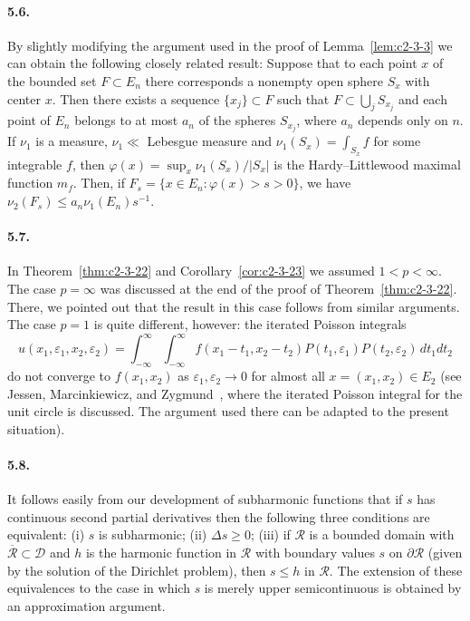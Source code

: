 \paragraph{5.6.} By slightly modifying the argument used in the proof of Lemma~\ref{lem:c2-3-3} we can obtain the following closely related result: Suppose that to each point $x$ of the bounded set $F \subset E_n$ there corresponds a nonempty open sphere $S_x$ with center $x$. Then there exists a sequence $\{x_j\} \subset F$ such that $F \subset \bigcup_j S_{x_j}$ and each point of $E_n$ belongs to at most $a_n$ of the spheres $S_{x_j}$, where $a_n$ depends only on $n$. If $\nu_1$ is a measure, $\nu_1 \ll$ Lebesgue measure and $\nu_1(S_x) = \int_{S_x} f$ for some integrable $f$, then $\varphi(x) = \sup_x \nu_1(S_x)/|S_x|$ is the Hardy--Littlewood maximal function $m_f$. Then, if $F_s = \{x \in E_n : \varphi(x) > s > 0\}$, we have $\nu_2(F_s) \leq a_n \nu_1(E_n) s^{-1}$.

\paragraph{5.7.} In Theorem~\ref{thm:c2-3-22} and Corollary~\ref{cor:c2-3-23} we assumed $1 < p < \infty$. The case $p = \infty$ was discussed at the end of the proof of Theorem~\ref{thm:c2-3-22}. There, we pointed out that the result in this case follows from similar arguments. The case $p = 1$ is quite different, however: the iterated Poisson integrals
\[
u(x_1, \varepsilon_1, x_2, \varepsilon_2) = \int_{-\infty}^\infty \int_{-\infty}^\infty f(x_1 - t_1, x_2 - t_2) P(t_1, \varepsilon_1) P(t_2, \varepsilon_2)\,dt_1 dt_2
\]
do not converge to $f(x_1, x_2)$ as $\varepsilon_1, \varepsilon_2 \to 0$ for almost all $x = (x_1, x_2) \in E_2$ (see Jessen, Marcinkiewicz, and Zygmund~\cite{JessenMarcinkiewiczZygmund1}, where the iterated Poisson integral for the unit circle is discussed. The argument used there can be adapted to the present situation).

\paragraph{5.8.} It follows easily from our development of subharmonic functions that if $s$ has continuous second partial derivatives then the following three conditions are equivalent: (i) $s$ is subharmonic; (ii) $\Delta s \geq 0$; (iii) if $\mathcal{R}$ is a bounded domain with $\overline{\mathcal{R}} \subset \mathcal{D}$ and $h$ is the harmonic function in $\mathcal{R}$ with boundary values $s$ on $\partial\mathcal{R}$ (given by the solution of the Dirichlet problem), then $s \leq h$ in $\mathcal{R}$. The extension of these equivalences to the case in which $s$ is merely upper semicontinuous is obtained by an approximation argument.

